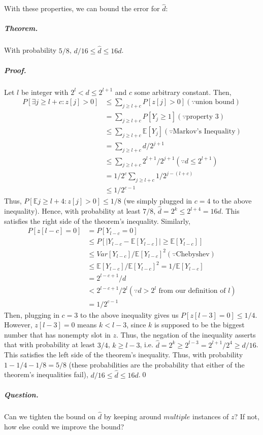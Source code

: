 \documentclass[12pt]{article}
\begin{document}
With these properties, we can bound the error for $\hat{d}$:
\subparagraph{Theorem.} With probability $5/8$, $d/16\leq\hat{d}\leq16d$.
\subparagraph{Proof.} Let $l$ be integer with $2^l<d\leq2^{l+1}$ and $c$ some arbitrary constant. Then, 
\begin{equation}
\begin{split}
P[\exists j\geq l+c:z[j]>0]&\leq\sum_{j\geq l+c}P[z[j]>0] (\because \text{union bound})\\
&=\sum_{j\geq l+c}P[Y_j\geq1] (\because\text{property 3})\\
&\leq\sum_{j\geq l+c}\mathbb{E}[Y_j] (\because\text{Markov's Inequality})\\
&=\sum_{j\geq l+c} d/2^{j+1}\\
&\leq\sum_{j\geq l+c}2^{l+1}/2^{j+1} (\because d\leq2^{l+1})\\
&=1/2^c\sum_{j\geq l+c}1/2^{j-(l+c)}\\
&\leq1/2^{c-1}
\end{split}
\end{equation}
Thus, $P[\mathbb{E}j\geq l+4:z[j]>0]\leq1/8$ (we simply plugged in $c=4$ to the above inequality). Hence, with probability at least $7/8$, $\hat{d}=2^k\leq2^{l+4}=16d$. This satisfies the right side of the theorem's inequality.
Similarly,
\begin{equation}
\begin{split}
P[z[l-c]=0]&=P[Y_{l-c}=0]\\
&\leq P[|Y_{l-c}-\mathbb{E}[Y_{l-c}]|\geq\mathbb{E}[Y_{l-c}]]\\
&\leq Var[Y_{l-c}]/\mathbb{E}[Y_{l-c}]^2 (\because\text{Chebyshev})\\
&\leq \mathbb{E}[Y_{l-c}]/\mathbb{E}[Y_{l-c}]^2 = 1/\mathbb{E}[Y_{l-c}]\\
&=2^{l-c+1}/d\\
&<2^{l-c+1}/2^l (\because d>2^l \text{ from our definition of } l)\\
&=1/2^{c-1}
\end{split}
\end{equation}
Then, plugging in $c=3$ to the above inequality gives us $P[z[l-3]=0]\leq1/4$. However, $z[l-3]=0$ means $k<l-3$, since $k$ is supposed to be the biggest number that has nonempty slot in $z$. Thus, the negation of the inequality asserts that with probability at least $3/4$, $k\geq l-3$, i.e. $\hat{d}=2^k\geq2^{l-3}=2^{l+1}/2^4\geq d/16$. This satisfies the left side of the theorem's inequality.
Thus, with probability $1-1/4-1/8=5/8$ (these probabilities are the probability that either of the theorem's inequalities fail), $d/16\leq\hat{d}\leq16d$.\qed
\subparagraph{Question.} Can we tighten the bound on $\hat{d}$ by keeping around $multiple$ instances of $z$? If not, how else could we improve the bound?
\end{document}
